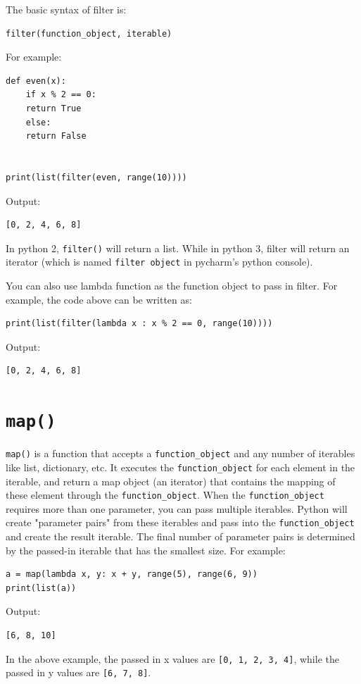 \documentclass[12pt]{book}
\begin{document}
The basic syntax of filter is:
\begin{verbatim}
filter(function_object, iterable)
\end{verbatim}
For example:
\begin{verbatim}
def even(x):
    if x % 2 == 0:
	return True
    else:
	return False


print(list(filter(even, range(10))))
\end{verbatim}
Output:
\begin{verbatim}
[0, 2, 4, 6, 8]
\end{verbatim}
In python 2, \texttt{filter()} will return a list. While in python 3, filter will return an iterator (which is named \texttt{filter object} in pycharm's python console).

You can also use lambda function as the function object to pass in filter. For example, the code above can be written as:
\begin{verbatim}
print(list(filter(lambda x : x % 2 == 0, range(10))))
\end{verbatim}
Output:
\begin{verbatim}
[0, 2, 4, 6, 8]
\end{verbatim}
\section{\texttt{map()}}
\label{sec:orgcae6501}
\texttt{map()} is a function that accepts a \texttt{function\_object} and any number of iterables like list, dictionary, etc. It executes the \texttt{function\_object} for each element in the iterable, and return a map object (an iterator) that contains the mapping of these element through the \texttt{function\_object}. When the \texttt{function\_object} requires more than one parameter, you can pass multiple iterables. Python will create "parameter pairs" from these iterables and pass into the \texttt{function\_object} and create the result iterable. The final number of parameter pairs is determined by the passed-in iterable that has the smallest size. For example:
\begin{verbatim}
a = map(lambda x, y: x + y, range(5), range(6, 9))
print(list(a))
\end{verbatim}
Output:
\begin{verbatim}
[6, 8, 10]
\end{verbatim}
In the above example, the passed in x values are \texttt{[0, 1, 2, 3, 4]}, while the passed in y values are \texttt{[6, 7, 8]}. 
\end{document}
